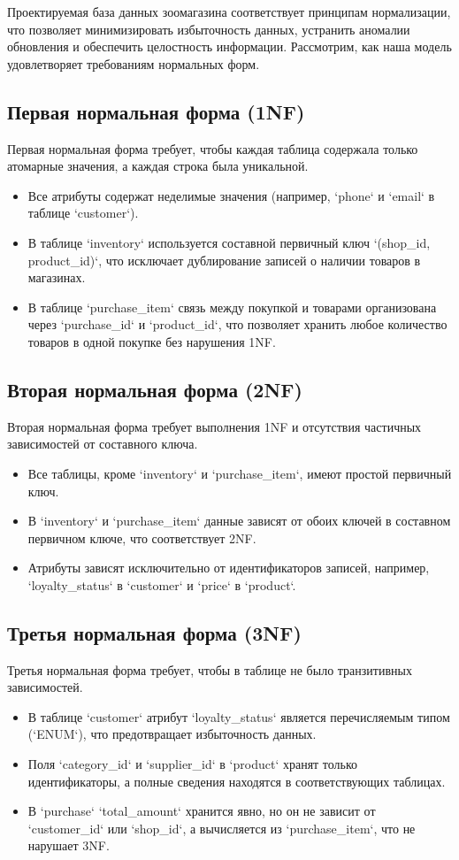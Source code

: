 Проектируемая база данных зоомагазина соответствует принципам нормализации,
что позволяет минимизировать избыточность данных, устранить аномалии обновления и обеспечить целостность информации.
Рассмотрим, как наша модель удовлетворяет требованиям нормальных форм.

\subsection{Первая нормальная форма (1NF)}\label{subsec:1nf}
Первая нормальная форма требует, чтобы каждая таблица содержала только атомарные значения,
а каждая строка была уникальной.
\begin{itemize}
    \item Все атрибуты содержат неделимые значения (например, `phone` и `email` в таблице `customer`).
    \item В таблице `inventory` используется составной первичный ключ `(shop\_id, product\_id)`,
    что исключает дублирование записей о наличии товаров в магазинах.
    \item В таблице `purchase\_item` связь между покупкой и товарами организована через `purchase\_id` и `product\_id`,
    что позволяет хранить любое количество товаров в одной покупке без нарушения 1NF\@.
\end{itemize}

\subsection{Вторая нормальная форма (2NF)}\label{subsec:2nf}
Вторая нормальная форма требует выполнения 1NF и отсутствия частичных зависимостей от составного ключа.
\begin{itemize}
    \item Все таблицы, кроме `inventory` и `purchase\_item`, имеют простой первичный ключ.
    \item В `inventory` и `purchase\_item` данные зависят от обоих ключей в составном первичном ключе,
    что соответствует 2NF\@.
    \item Атрибуты зависят исключительно от идентификаторов записей, например,
    `loyalty\_status` в `customer` и `price` в `product`.
\end{itemize}

\subsection{Третья нормальная форма (3NF)}\label{subsec:3nf}
Третья нормальная форма требует, чтобы в таблице не было транзитивных зависимостей.
\begin{itemize}
    \item В таблице `customer` атрибут `loyalty\_status` является перечисляемым типом (`ENUM`),
    что предотвращает избыточность данных.
    \item Поля `category\_id` и `supplier\_id` в `product` хранят только идентификаторы,
    а полные сведения находятся в соответствующих таблицах.
    \item В `purchase` `total\_amount` хранится явно, но он не зависит от `customer\_id` или `shop\_id`,
    а вычисляется из `purchase\_item`, что не нарушает 3NF\@.
\end{itemize}

